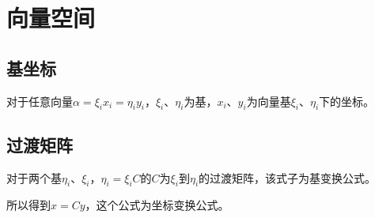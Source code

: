 \documentclass[UTF8, 12pt]{ctexart}
\begin{document}
\section{向量空间}







\subsection{基坐标}

对于任意向量$\alpha=\xi_ix_i=\eta_iy_i$，$\xi_i$、$\eta_i$为基，$x_i$、$y_i$为向量基$\xi_i$、$\eta_i$下的坐标。

\subsection{过渡矩阵}

对于两个基$\eta_i$、$\xi_i$，$\eta_i=\xi_iC$的$C$为$\xi_i$到$\eta_i$的过渡矩阵，该式子为基变换公式。

所以得到$x=Cy$，这个公式为坐标变换公式。
\end{document}
